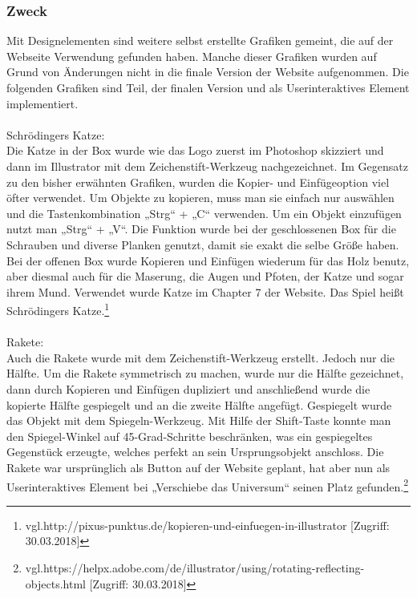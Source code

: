 \subsubsection{Zweck}
Mit Designelementen sind weitere selbst erstellte Grafiken gemeint, die auf der Webseite Verwendung gefunden haben. Manche dieser Grafiken wurden auf Grund von Änderungen nicht in die finale Version der Website aufgenommen. Die folgenden Grafiken sind Teil, der finalen Version und als Userinteraktives Element implementiert.
\leavevmode \\
\leavevmode \\
Schrödingers Katze:
\leavevmode \\
Die Katze in der Box wurde wie das Logo zuerst im Photoshop skizziert und dann im Illustrator mit dem Zeichenstift-Werkzeug nachgezeichnet. Im Gegensatz zu den bisher erwähnten Grafiken, wurden die Kopier- und Einfügeoption viel öfter verwendet. Um Objekte zu kopieren, muss man sie einfach nur auswählen und die Tastenkombination „Strg“ + „C“ verwenden. Um ein Objekt einzufügen nutzt man „Strg“ + „V“. Die Funktion wurde bei der geschlossenen Box für die Schrauben und diverse Planken genutzt, damit sie exakt die selbe Größe haben. Bei der offenen Box wurde Kopieren und Einfügen wiederum für das Holz benutz, aber diesmal auch für die Maserung, die Augen und Pfoten, der Katze und sogar ihrem Mund. Verwendet wurde Katze im Chapter 7 der Website. Das Spiel heißt Schrödingers Katze.\footnote{\label{} vgl.http://pixus-punktus.de/kopieren-und-einfuegen-in-illustrator [Zugriff: 30.03.2018]}
\leavevmode \\
\leavevmode \\
Rakete: 
\leavevmode \\
Auch die Rakete wurde mit dem Zeichenstift-Werkzeug erstellt. Jedoch nur die Hälfte. Um die Rakete symmetrisch zu machen, wurde nur die Hälfte gezeichnet, dann durch Kopieren und Einfügen dupliziert und anschließend wurde die kopierte Hälfte gespiegelt und an die zweite Hälfte angefügt. Gespiegelt wurde das Objekt mit dem Spiegeln-Werkzeug. Mit Hilfe der Shift-Taste konnte man den Spiegel-Winkel auf 45-Grad-Schritte beschränken, was ein gespiegeltes Gegenstück erzeugte, welches perfekt an sein Ursprungsobjekt anschloss. Die Rakete war ursprünglich als Button auf der Website geplant, hat aber nun als Userinteraktives Element bei „Verschiebe das Universum“ seinen Platz gefunden.\footnote{\label{} vgl.https://helpx.adobe.com/de/illustrator/using/rotating-reflecting-objects.html [Zugriff: 30.03.2018]}
\leavevmode \\
